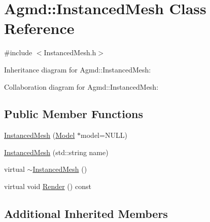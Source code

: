 \hypertarget{class_agmd_1_1_instanced_mesh}{\section{Agmd\+:\+:Instanced\+Mesh Class Reference}
\label{class_agmd_1_1_instanced_mesh}
}


{\ttfamily \#include $<$Instanced\+Mesh.\+h$>$}



Inheritance diagram for Agmd\+:\+:Instanced\+Mesh\+:


Collaboration diagram for Agmd\+:\+:Instanced\+Mesh\+:
\subsection*{Public Member Functions}
\begin{DoxyCompactItemize}
\item 
\hyperlink{class_agmd_1_1_instanced_mesh_aad1ba467211af8f7e1c1efab1f43bd12}{Instanced\+Mesh} (\hyperlink{class_agmd_1_1_model}{Model} $\ast$model=N\+U\+L\+L)
\item 
\hyperlink{class_agmd_1_1_instanced_mesh_ae239f5e3a573e3f93a14f63bbb3b3051}{Instanced\+Mesh} (std\+::string name)
\item 
virtual \hyperlink{class_agmd_1_1_instanced_mesh_ab5c66e3223a64806098ed0351fe0bed6}{$\sim$\+Instanced\+Mesh} ()
\item 
virtual void \hyperlink{class_agmd_1_1_instanced_mesh_a653711846b5fff21a70178295779d088}{Render} () const 
\end{DoxyCompactItemize}
\subsection*{Additional Inherited Members}


